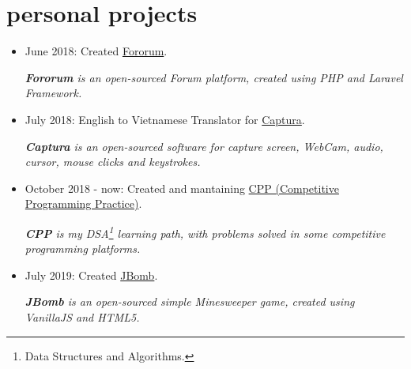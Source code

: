 \documentclass{article}
\begin{document}
\section{personal projects}
\begin{multicols}{2}
\begin{itemize}
\item June 2018: Created \href{https://github.com/trhgquan/Fororum}{Fororum}.

\textit{\textbf{Fororum} is an open-sourced Forum platform, created using PHP and Laravel Framework.}

\item July 2018: English to Vietnamese Translator for \href{https://github.com/MathewSachin/Captura}{Captura}.

\textit{\textbf{Captura} is an open-sourced software for capture screen, WebCam, audio, cursor, mouse clicks and keystrokes.}

\item October 2018 - now: Created and mantaining \href{https://github.com/trhgquan/CPP}{CPP (Competitive Programming Practice)}.

\textit{\textbf{CPP} is my DSA\footnote{Data Structures and Algorithms.} learning path, with problems solved in some competitive programming platforms.}

\item July 2019: Created \href{https://github.com/trhgquan/JBomb}{JBomb}.

\textit{\textbf{JBomb} is an open-sourced simple Minesweeper game, created using VanillaJS and HTML5.}
\end{itemize}
\end{multicols}
\end{document}

